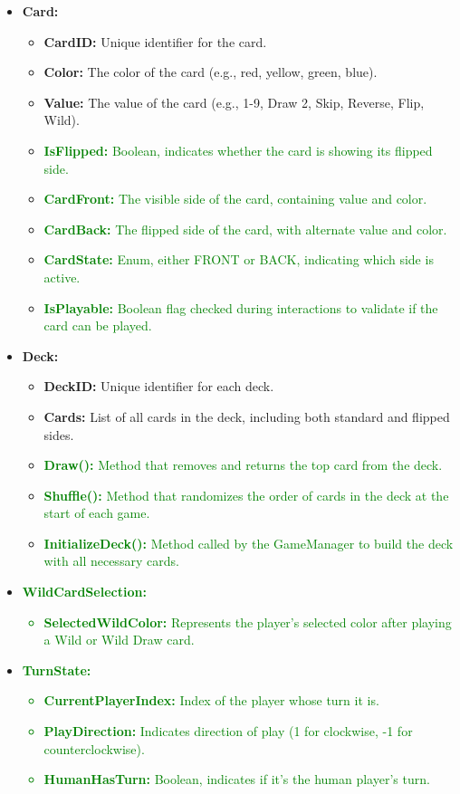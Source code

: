 \documentclass[12pt]{article}
\newcommand{\added}[1]{\textcolor{green}{#1}}
\begin{document}
\begin{itemize}
    \item \textbf{Card:}
    \begin{itemize}
        \item \textbf{CardID:} Unique identifier for the card.
        \item \textbf{Color:} The color of the card (e.g., red, yellow, green, blue).
        \item \textbf{Value:} The value of the card (e.g., 1-9, Draw 2, Skip, Reverse, Flip, Wild).
        \item \added{\textbf{IsFlipped:} Boolean, indicates whether the card is showing its flipped side.}
        \item \added{\textbf{CardFront:} The visible side of the card, containing value and color.}
        \item \added{\textbf{CardBack:} The flipped side of the card, with alternate value and color.}
        \item \added{\textbf{CardState:} Enum, either FRONT or BACK, indicating which side is active.}
        \item \added{\textbf{IsPlayable:} Boolean flag checked during interactions to validate if the card can be played.}
    \end{itemize}

    \item \textbf{Deck:}
    \begin{itemize}
        \item \textbf{DeckID:} Unique identifier for each deck.
        \item \textbf{Cards:} List of all cards in the deck, including both standard and flipped sides.
        \item \added{\textbf{Draw():} Method that removes and returns the top card from the deck.}
        \item \added{\textbf{Shuffle():} Method that randomizes the order of cards in the deck at the start of each game.}
        \item \added{\textbf{InitializeDeck():} Method called by the GameManager to build the deck with all necessary cards.}
    \end{itemize}

    \item \added{\textbf{WildCardSelection:}
    \begin{itemize}
        \item \textbf{SelectedWildColor:} Represents the player's selected color after playing a Wild or Wild Draw card.
    \end{itemize}}

    \item \added{\textbf{TurnState:}
    \begin{itemize}
        \item \textbf{CurrentPlayerIndex:} Index of the player whose turn it is.
        \item \textbf{PlayDirection:} Indicates direction of play (1 for clockwise, -1 for counterclockwise).
        \item \textbf{HumanHasTurn:} Boolean, indicates if it's the human player's turn.
    \end{itemize}}
\end{itemize}
\end{document}
